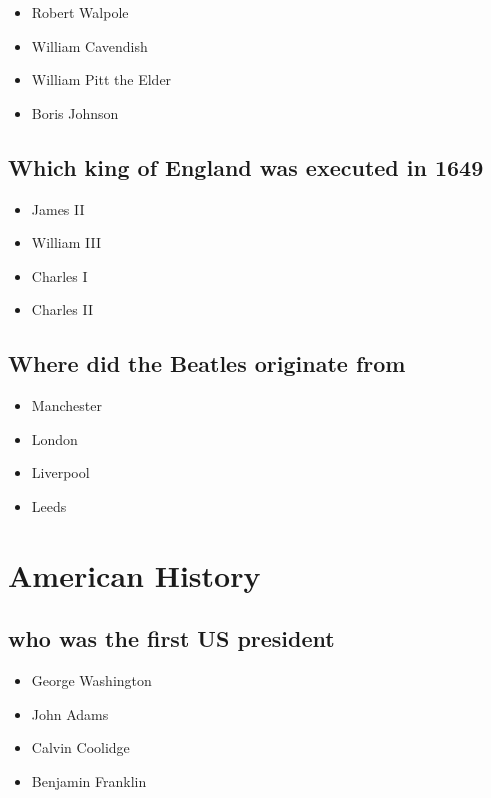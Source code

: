 \documentclass{article}
\begin{document}
\begin{itemize}
\item Robert Walpole
\item William Cavendish
\item William Pitt the Elder
\item Boris Johnson

\end{itemize}


\subsection{Which king of England was executed in 1649}

\begin{itemize}
\item James II
\item William III
\item Charles I
\item Charles II

\end{itemize}


\subsection{Where did the Beatles originate from}

\begin{itemize}
\item Manchester
\item London
\item Liverpool
\item Leeds

\end{itemize}


\section{American History}





\subsection{who was the first US president}

\begin{itemize}
\item George Washington
\item John Adams
\item Calvin Coolidge
\item Benjamin Franklin

\end{itemize}
\end{document}
